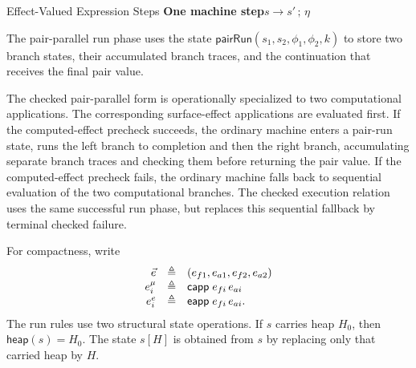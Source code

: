 \begin{formalbox}{Effect-Valued Expression Steps}
\small
\noindent\textbf{One machine step}\hfill $\boxed{s\longrightarrow s'\,;\,\eta}$


\end{formalbox}

The pair-parallel run phase uses the state
$\mathsf{pairRun}(s_1,s_2,\phi_1,\phi_2,k)$ to store two branch states, their
accumulated branch traces, and the continuation that receives the final pair value.

The checked pair-parallel form is operationally specialized to two computational
applications.  The corresponding surface-effect applications are evaluated
first.  If the computed-effect precheck succeeds, the ordinary machine enters a
pair-run state, runs the left branch to completion and then the right branch,
accumulating separate branch traces and checking them before returning the pair value.
If the computed-effect precheck fails, the ordinary machine falls back to
sequential evaluation of the two computational branches.  The checked execution
relation uses the same successful run phase, but replaces this sequential
fallback by terminal checked failure.

For compactness, write
\[
\begin{array}{rcl}
\vec e & \triangleq & (e_{f1},e_{a1},e_{f2},e_{a2})\\
e_i^\mu & \triangleq & \mathsf{capp}\; e_{fi}\,e_{ai}\\
e_i^e & \triangleq & \mathsf{eapp}\; e_{fi}\,e_{ai}.
\end{array}
\]
The run rules use two structural state operations.  If $s$ carries heap $H_0$,
then $\mathsf{heap}(s)=H_0$.  The state $s[H]$ is obtained from $s$ by replacing
only that carried heap by $H$.

